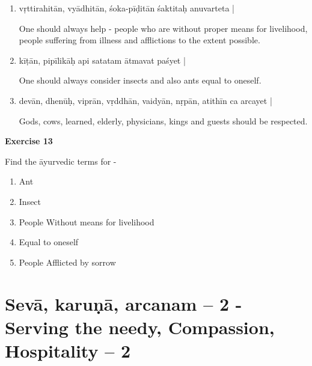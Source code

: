 \begin{enumerate}
\item {}

vṛttirahitān, vyādhitān, śoka-pīḍitān śaktitaḥ anuvarteta | 

One should always help - people who are without proper means for livelihood, people suffering from illness and afflictions to the extent possible.   

\item {}

kīṭān, pipīlikāḥ api satatam ātmavat paśyet | 

One should always consider insects and also ants equal to oneself. 

\item {}

devān, dhenūḥ, viprān, vṛddhān, vaidyān, nṛpān, atithīn ca arcayet |   

Gods, cows, learned, elderly, physicians, kings and guests should be respected.
\end{enumerate}

\begin{center}
\textbf{\large Exercise 13}
\end{center}

Find the āyurvedic terms for -

\begin{enumerate}
\renewcommand{\theenumi}{\alph{enumi}}
\renewcommand{\labelenumi}{\theenumi.}
\item Ant
\item Insect
\item People Without means for livelihood
\item Equal to oneself
\item People Afflicted by sorrow
\end{enumerate}

\chapter{Sevā, karuṇā, arcanam – 2 - Serving the needy, Compassion, Hospitality – 2}

